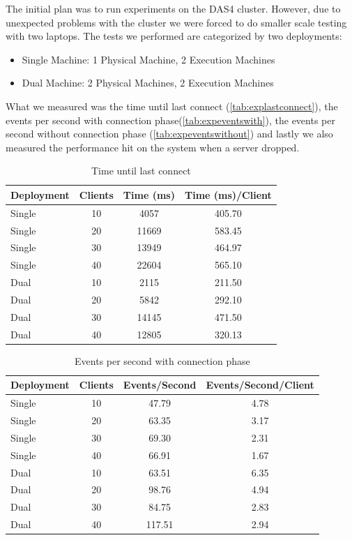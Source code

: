 \documentclass[a4paper,10pt]{article}
\begin{document}
The initial plan was to run experiments on the DAS4 cluster.
However, due to unexpected problems with the cluster we were forced to do smaller scale testing with two laptops.
The tests we performed are categorized by two deployments: 

\begin{itemize}
\item Single Machine: 1 Physical Machine, 2 Execution Machines
\item Dual Machine: 2 Physical Machines, 2 Execution Machines
\end{itemize}

What we measured was the time until last connect (\autoref{tab:explastconnect}), the  events per second with connection phase(\autoref{tab:expeventswith}),
the events per second without connection phase (\autoref{tab:expeventswithout}) and 
lastly we also measured the performance hit on the system when a server dropped.

\begin{table}
\centering
\begin{tabular}{| l | c | c | c |}
\hline
\textbf{Deployment} & \textbf{Clients} & \textbf{Time (ms)}  & \textbf{Time (ms)/Client} \\
\hline
\hline
Single & 10 & 4057 & 405.70\\
\hline
Single & 20 & 11669 &583.45 \\
\hline
Single & 30& 13949 & 464.97\\
\hline
Single & 40& 22604 & 565.10\\
\hline
\hline
Dual & 10 & 2115 &211.50 \\
\hline
Dual & 20 & 5842 &292.10 \\
\hline
Dual & 30 & 14145 &471.50 \\
\hline
Dual & 40 & 12805 &320.13 \\
\hline
\end{tabular}
\caption{Time until last connect}
\label{tab:explastconnect}
\end{table}

\begin{table}
\centering
\begin{tabular}{| l | c | c | c |}
\hline
\textbf{Deployment} & \textbf{Clients} & \textbf{Events/Second}  & \textbf{Events/Second/Client} \\
\hline
\hline
Single & 10 & 47.79& 4.78\\
\hline
Single & 20 &63.35 &3.17 \\
\hline
Single & 30& 69.30& 2.31\\
\hline
Single & 40& 66.91& 1.67\\
\hline
\hline
Dual & 10 & 63.51& 6.35\\
\hline
Dual & 20 & 98.76&4.94 \\
\hline
Dual & 30 & 84.75&2.83 \\
\hline
Dual & 40 &117.51 & 2.94\\
\hline
\end{tabular}
\caption{Events per second with connection phase}
\label{tab:expeventswith}
\end{table}
\end{document}
